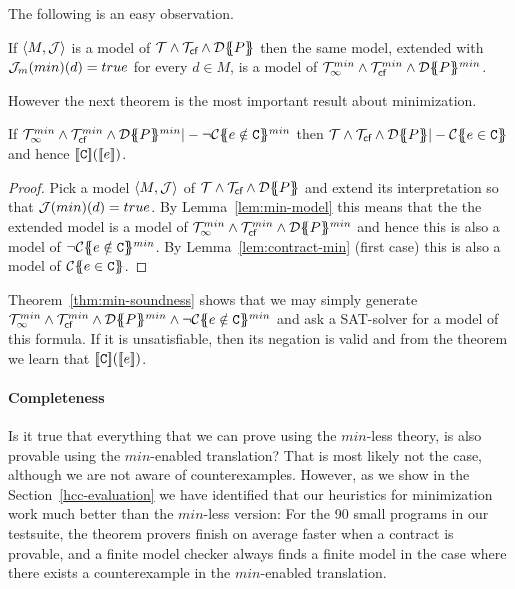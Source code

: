 The following is an easy observation. 
\begin{lemma}\label{lem:min-model} If $\langle M,{\cal J}\rangle$ is a model of ${\cal T} \land {\cal T}_{\textsf{cf}} \land {\cal D}\{\!\!\{P\}\!\!\}$ then the same model, extended with
${\cal J}_m(min)(d) = true$ for every $d \in M$, is a model of ${\cal T}_{\infty}^{min} \land {\cal T}_{\textsf{cf}}^{min} \land {\cal D}\{\!\!\{P\}\!\!\}^{min}$. 
\end{lemma}
However the next theorem is the most important result about minimization. 
\begin{theorem}\label{thm:min-soundness} If $\ThMin\land \Th_{\lcfZ}^{min} \land \dtrans{}{P}^{min} |- \neg \ctransmin{}{}{e \notin \Ct}$ then 
                   $\Th \land \Th_{\lcfZ} \land \dtrans{}{P} |- \ctrans{}{}{e \in \Ct}$ and hence $[\![{\tt C}]\!]([\![e]\!])$.
\end{theorem}
\begin{proof}
Pick a model $\langle M, {\cal J}\rangle$ of ${\cal T} \land {\cal T}_{\textsf{cf}} \land {\cal D}\{\!\!\{P\}\!\!\}$ and extend its interpretation 
so that ${\cal J}(min)(d) = true$. By Lemma~\ref{lem:min-model} this means that the the extended model is a model of 
${\cal T}_{\infty}^{min}\land {\cal T}_{\textsf{cf}}^{min} \land {\cal D}\{\!\!\{P\}\!\!\}^{min}$ and hence this is also a model of $\neg {\cal C}\{\!\!\{e \notin {\tt C}\}\!\!\}^{min}$. 
By Lemma~\ref{lem:contract-min} (first case) this is also a model of ${\cal C}\{\!\!\{e \in {\tt C}\}\!\!\}$.
\end{proof} 
Theorem~\ref{thm:min-soundness} shows that we may simply generate $\ThMin \land \Th_{\lcfZ}^{min} \land \dtrans{}{P}^{min} \land \neg \ctransmin{}{}{e \notin \Ct}$
and ask a SAT-solver for a model of this formula. If it is unsatisfiable, then its negation is valid and from the theorem we learn that $[\![{\tt C}]\!]([\![e]\!])$.


\paragraph{Completeness}

Is it true that everything that we can prove using 
the $min$-less theory, is also provable using the $min$-enabled translation? 
That is most likely not the case, although we are not aware of counterexamples. However, as we show
in the Section~\ref{hcc-evaluation} we have identified that our heuristics for minimization work much 
better than the $min$-less version: For the 90 small programs in our testsuite, the theorem provers 
finish on average faster when a contract is provable, and a finite model checker always finds a finite 
model in the case where there exists a counterexample in the $min$-enabled translation.


